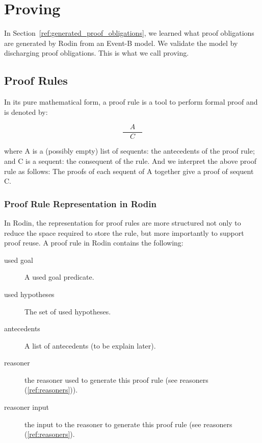 \section{Proving}
\label{reference_04}

In Section~\ref{ref:generated_proof_obligations}, we learned what proof obligations are generated by Rodin from an Event-B model.  We validate the model by discharging proof obligations.  This is what we call proving.


\subsection{Proof Rules}

In its pure mathematical form, a proof rule is a tool to perform formal proof and is denoted by: 

$$\frac{\quad A\quad}{C}$$

where A is a (possibly empty) list of sequents: the antecedents of the proof rule; and C is a sequent: the consequent of the rule. And we interpret the above proof rule as follows: The proofs of each sequent of A together give a proof of sequent C. 


\subsubsection{Proof Rule Representation in Rodin}

In Rodin, the representation for proof rules are more structured not only to reduce the space required to store the rule, but more importantly to support proof reuse.
A proof rule in Rodin contains the following:

\begin{description}
	\item[used goal] A used goal predicate. 
	\item[used hypotheses] The set of used hypotheses. 
	\item[antecedents] A list of antecedents (to be explain later). 
	\item[reasoner] the reasoner used to generate this proof rule (see reasoners (\ref{ref:reasoners})). 
	\item[reasoner input] the input to the reasoner to generate this proof rule (see reasoners (\ref{ref:reasoners}). 
\end{description}

